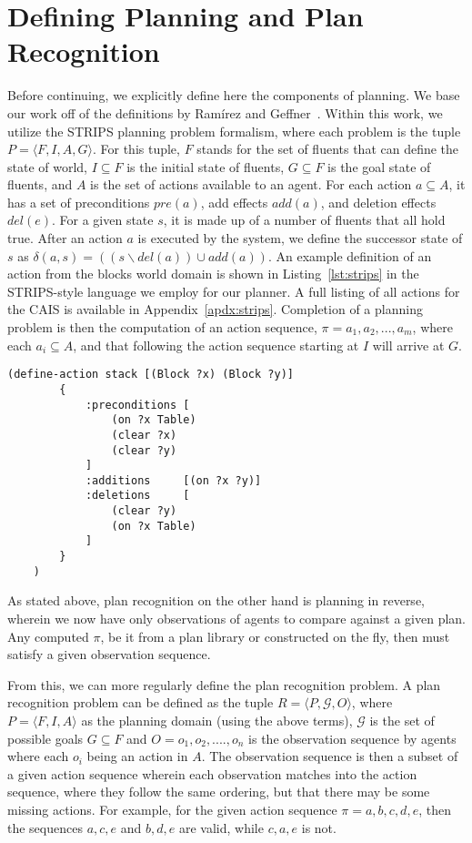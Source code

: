 \section{Defining Planning and Plan Recognition}

Before continuing, we explicitly define here the components of planning. We base our
work off of the definitions by Ramírez and Geffner~\cite{ramirez_plan_2009}.
Within this work, we utilize the STRIPS planning problem formalism, where each problem is the
tuple $P = \langle F, I, A, G \rangle$. For this tuple, $F$ stands for the set of
fluents that can define the state of world, $I \subseteq F$ is the initial state of
fluents, $G \subseteq F$ is the goal state of fluents, and $A$ is the set of actions
available to an agent. For each action $a \subseteq A$, it has a set
of preconditions $pre(a)$, add effects $add(a)$, and deletion effects $del(e)$. For a given state
$s$, it is made up of a number of fluents that all hold true. After an action $a$ is executed
by the system, we define the successor state of $s$ as
$\delta(a, s) = ((s \backslash del(a)) \cup add(a))$. An example definition of an
action from the blocks world domain is shown in Listing~\ref{lst:strips} in the STRIPS-style
language we employ for our planner. A full listing of all actions for the CAIS is available in Appendix~\ref{apdx:strips}. Completion of a planning problem is then the computation of
an action sequence, $\pi = a_{1}, a_{2}, ..., a_{m}$, where each
$a_{i} \subseteq A$, and that following the action sequence starting at $I$
will arrive at $G$.

\begin{lstlisting}[caption=Stack action defined in STRIPS style,label={lst:strips}]
    (define-action stack [(Block ?x) (Block ?y)]
        {
            :preconditions [
                (on ?x Table)
                (clear ?x)
                (clear ?y)
            ]
            :additions     [(on ?x ?y)]
            :deletions     [
                (clear ?y)
                (on ?x Table)
            ]
        }
    )
\end{lstlisting}

As stated above, plan recognition on the other hand is planning in reverse,
wherein we now have only observations of agents to compare against a given plan.
Any computed $\pi$, be it from a plan library or constructed on the fly, then
must satisfy a given observation sequence.

From this, we can more regularly define the plan recognition problem. A plan recognition
problem can be defined as the tuple $R = \langle P, \mathcal{G}, O \rangle$, where
$P = \langle F, I, A \rangle$ as the planning domain (using the above terms),
$\mathcal{G}$ is the set of possible goals $G \subseteq F$ and
$O = o_{1}, o_{2}, ...., o_{n}$ is the observation sequence by agents where each
$o_{i}$ being an action in $A$. The observation sequence is then a subset
of a given action sequence wherein each observation matches into the action
sequence, where they follow the same ordering, but that there may be some missing
actions. For example, for the given action sequence $\pi = {a,b,c,d,e}$, then
the sequences ${a,c,e}$ and ${b,d,e}$ are valid, while ${c,a,e}$ is not.